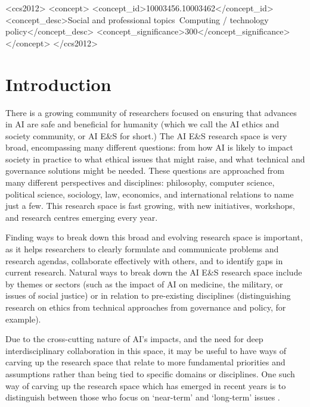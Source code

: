 \documentclass[sigconf]{acmart}
\begin{document}
\begin{CCSXML}
<ccs2012>
<concept>
<concept_id>10003456.10003462</concept_id>
<concept_desc>Social and professional topics~Computing / technology policy</concept_desc>
<concept_significance>300</concept_significance>
</concept>
</ccs2012>
\end{CCSXML}



\maketitle
\section{Introduction}

There is a growing community of researchers focused on ensuring that advances in AI are safe and beneficial for humanity (which we call the AI ethics and society community, or AI E\&S for short.) The AI E\&S research space is very broad, encompassing many different questions: from how AI is likely to impact society in practice to what ethical issues that might raise, and what technical and governance solutions might be needed. These questions are approached from many different perspectives and disciplines: philosophy, computer science, political science, sociology, law, economics, and international relations to name just a few. This research space is fast growing, with new initiatives, workshops, and research centres emerging every year.

Finding ways to break down this broad and evolving research space is important, as it helps researchers to clearly formulate and communicate problems and research agendas, collaborate effectively with others, and to identify gaps in current research. Natural ways to break down the AI E\&S research space include by themes or sectors (such as the impact of AI on medicine, the military, or issues of social justice) or in relation to pre-existing disciplines (distinguishing research on ethics from technical approaches from governance and policy, for example).

Due to the cross-cutting nature of AI's impacts, and the need for deep interdisciplinary collaboration in this space, it may be useful to have ways of carving up the research space that relate to more fundamental priorities and assumptions rather than being tied to specific domains or disciplines. One such way of carving up the research space which has emerged in recent years is to distinguish between those who focus on `near-term' and `long-term' issues \cite{brundage_guide_2017,cave_bridging_2019,krakovna_is_2018,parson_artificial_2019}.
\end{document}
